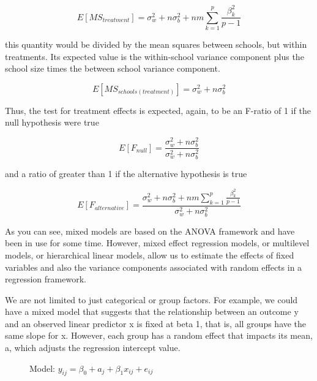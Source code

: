 \[
E[MS_{treatment}] = \sigma_w^2+n\sigma_b^2+nm\sum_{k=1}^p\frac{\beta_k^2}{p-1}
\]

this quantity would be divided by the mean squares between schools, but within treatments. Its expected value is the within-school variance component plus the school size times the between school variance component.

\[
E[MS_{schools(treatment)}] = \sigma_w^2+n\sigma_b^2
\]

Thus, the test for treatment effects is expected, again, to be an F-ratio of 1 if the null hypothesis were true

\[
E[F_{null}] = \frac{\sigma_w^2+n\sigma_b^2}{\sigma_w^2+n\sigma_b^2}
\]

and a ratio of greater than 1 if the alternative hypothesis is true

\[
E[F_{alternative}] = \frac{\sigma_w^2+n\sigma_b^2+nm\sum_{k=1}^p\frac{\beta_k^2}{p-1}}{\sigma_w^2+n\sigma_b^2}
\]

As you can see, mixed models are based on the ANOVA framework and have been in use for some time. However, mixed effect regression models, or multilevel models, or hierarchical linear models, allow us to estimate the effects of fixed variables and also the variance components associated with random effects in a regression framework.

We are not limited to just categorical or group factors. For example, we could have a mixed model that suggests that the relationship between an outcome y and an observed linear predictor x is fixed at beta 1, that is, all groups have the same slope for x. However, each group has a random effect that impacts its mean, a, which adjusts the regression intercept value.

\begin{figure}
  \centering
  \caption{Model: $y_{ij} = \beta_0+a_j+\beta_1x_{ij}+e_{ij}$}\label{hlmfig}
\end{figure}

